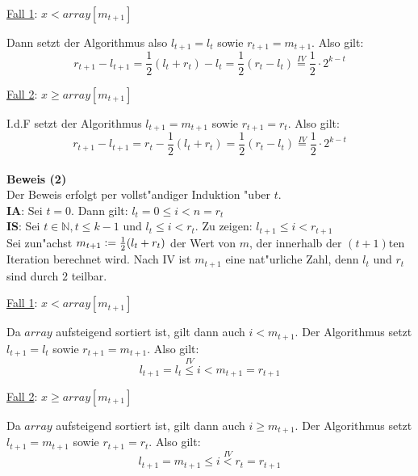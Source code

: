 \documentclass{scrartcl}
\newcommand{\defeq}{\vcentcolon=}
\begin{document}
\uline{Fall 1}: $x < array[m_{t+1}]$

Dann setzt der Algorithmus also $l_{t+1} = l_t$ sowie $r_{t+1} = m_{t+1}$. Also gilt:
\[r_{t+1} - l_{t+1} = \frac{1}{2}(l_t + r_t) - l_t = \frac{1}{2}(r_t - l_t) \overset{IV}{=} \frac{1}{2}\cdot 2^{k-t}\]

\uline{Fall 2}: $x \geq array[m_{t+1}]$

I.d.F setzt der Algorithmus $l_{t+1} = m_{t+1}$ sowie $r_{t+1} = r_t$. Also gilt:
\[r_{t+1} - l_{t+1} = r_t - \frac{1}{2}(l_t + r_t) = \frac{1}{2}(r_t - l_t) \overset{IV}{=} \frac{1}{2}\cdot 2^{k-t}\] \\[3em]

\noindent\textbf{Beweis (2)}\\

Der Beweis erfolgt per vollst"andiger Induktion "uber $t$.\\

\noindent\textbf{IA}: Sei $t = 0$. Dann gilt: $l_t = 0 \leq i < n = r_t$ \\
\textbf{IS}: Sei $t \in \mathbb{N}, t \leq k - 1$ und $l_t \leq i < r_t$. Zu zeigen: $l_{t+1} \leq i < r_{t+1}$ \\

Sei zun"achst $m_{t+1} \defeq \frac{1}{2}(l_t + r_t)$ der Wert von $m$, der innerhalb der $(t+1)$ten Iteration berechnet wird.
Nach IV ist $m_{t+1}$ eine nat"urliche Zahl, denn $l_t$ und $r_t$ sind durch $2$ teilbar.

\uline{Fall 1}: $x < array[m_{t+1}]$

Da $array$ aufsteigend sortiert ist, gilt dann auch $i < m_{t+1}$.
Der Algorithmus setzt $l_{t+1} = l_t$ sowie $r_{t+1} = m_{t+1}$. Also gilt:
\[l_{t+1} = l_t \overset{IV}{\leq} i < m_{t+1} = r_{t+1}\]

\uline{Fall 2}: $x \geq array[m_{t+1}]$

Da $array$ aufsteigend sortiert ist, gilt dann auch $i \geq m_{t+1}$.
Der Algorithmus setzt $l_{t+1} = m_{t+1}$ sowie $r_{t+1} = r_t$. Also gilt:
\[l_{t+1} = m_{t+1} \leq i \overset{IV}{<} r_t = r_{t+1}\]
\end{document}
